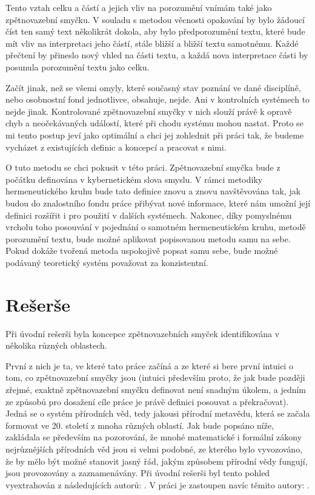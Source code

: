 \documentclass[11pt,a4paper]{article}
\begin{document}
Tento vztah celku a částí a jejich vliv na porozumění vnímám také jako zpětnovazební smyčku. V souladu s metodou věcnosti opakování by bylo žádoucí číst ten samý text několikrát dokola, aby bylo předporozumění textu, které bude mít vliv na interpretaci jeho částí, stále bližší a bližší textu samotnému. Každé přečtení by přineslo nový vhled na části textu, a každá nova interpretace části by posunula porozumění textu jako celku. 

Začít jinak, než se všemi omyly, které současný stav poznání ve dané disciplíně, nebo osobnostní fond jednotlivce, obsahuje, nejde. Ani v  kontrolních systémech to nejde jinak. Kontrolované zpětnovazební smyčky v nich slouží právě k opravě chyb a neočekávaných událostí, které při chodu systému mohou nastat. Proto se mi tento postup jeví jako optimální a chci jej zohlednit při práci tak, že budeme vycházet z existujících definic a koncepcí a pracovat s nimi.

O tuto metodu se chci pokusit v této práci. Zpětnovazební smyčka bude z počátku definována v kybernetickém slova smyslu. V rámci metodiky hermeneutického kruhu bude tato definice znovu a znovu navštěvována tak, jak budou do znalostního fondu práce přibývat nové informace, které nám umožní její definici rozšířit i pro použití v dalších systémech. Nakonec, díky pomyslnému vrcholu toho posouvání v pojednání o samotném hermeneutickém kruhu, metodě porozumění textu, bude možné aplikovat popisovanou metodu samu na sebe. Pokud dokáže tvořená metoda uspokojivě popsat samu sebe, bude možné podávaný teoretický systém považovat za konzistentní. 

\pagebreak


\section*{Rešerše}

Při úvodní rešerši byla koncepce zpětnovazebních smyček identifikována v několika různých oblastech. 

První z nich je ta, ve které tato práce začíná a ze které si bere první intuici o tom, co zpětnovazební smyčky jsou (intuici především proto, že jak bude později zřejmé, exaktně zpětnovazební smyčku definovat není snadným úkolem, a jedním ze způsobů pro dosažení cíle práce je právě definici posouvat a překračovat). Jedná se o systém přírodních věd, tedy jakousi přírodní metavědu, která se začala formovat ve 20. století z mnoha různých oblastí. Jak bude popsáno níže, zakládala se především na pozorování, že mnohé matematické i formální zákony nejrůznějších přírodních věd jsou si velmi podobné, ze kterého bylo vyvozováno, že by mělo být možné stanovit jasný řád, jakým způsobem přírodní vědy fungují, jsou provozovány a zaznamenávány. 
Při úvodní rešerši byl tento pohled vyextrahován z následujících autorů: \cite{gleick_chaos_1998, wiener_cybernetics_2019, ashby_introduction_2015, astrom_feedback_2021, mindell_between_2002}. V práci je zastoupen navíc těmito autory: \cite{von_bertalanffy_outline_1950, strauss_scope_2002}.
\end{document}
